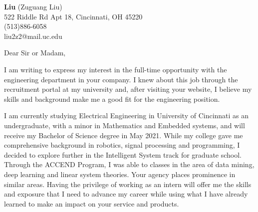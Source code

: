 \documentclass[11pt]{letter} %
\begin{document}

\begin{letter}
{\vspace{-15pt}} 


\begin{center}
\large \textbf{Liu} (Zuguang Liu) \\ %
522 Riddle Rd Apt 18, Cincinnati, OH 45220 \\ (513)886-6058  \\ liu2z2@mail.uc.edu%
\end{center} 


\signature{Liu (Zuguang Liu)} %


\opening{Dear Sir or Madam,} 
 
I am writing to express my interest in the full-time opportunity with the engineering department in your company. I knew about this job through the recruitment portal at my university and, after visiting your website, I believe my skills and background make me a good fit for the engineering position.  

I am currently studying Electrical Engineering in University of Cincinnati as an undergraduate, with a minor in Mathematics and Embedded systems, and will receive my Bachelor of Science degree in May 2021. While my college gave me comprehensive background in robotics, signal processing and programming, I decided to explore further in the Intelligent System track for graduate school. Through the ACCEND Program, I was able to classes in the area of data mining, deep learning and linear system theories. Your agency places prominence in similar areas. Having the privilege of working as an intern will offer me the skills and exposure that I need to advance my career while using what I have already learned to make an impact on your service and products. 


\end{letter}
\end{document}
